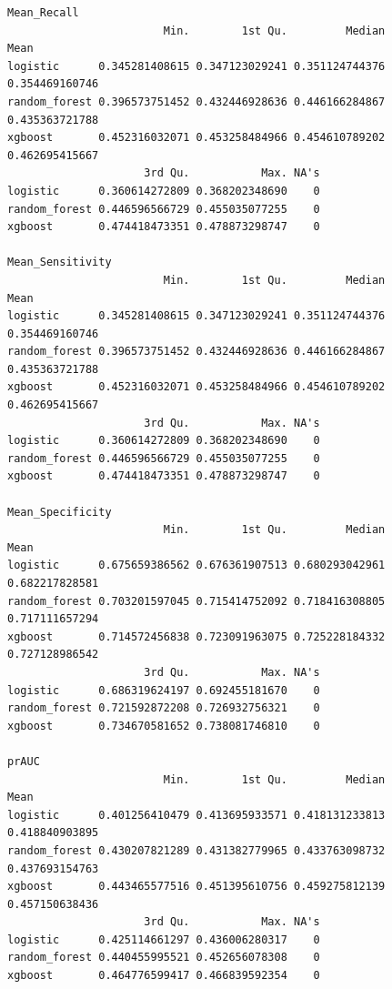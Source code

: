 \documentclass[
  letterpaper,
  DIV=11,
  numbers=noendperiod]{scrartcl}
\begin{document}
\begin{verbatim}
Mean_Recall 
                        Min.        1st Qu.         Median           Mean
logistic      0.345281408615 0.347123029241 0.351124744376 0.354469160746
random_forest 0.396573751452 0.432446928636 0.446166284867 0.435363721788
xgboost       0.452316032071 0.453258484966 0.454610789202 0.462695415667
                     3rd Qu.           Max. NA's
logistic      0.360614272809 0.368202348690    0
random_forest 0.446596566729 0.455035077255    0
xgboost       0.474418473351 0.478873298747    0

Mean_Sensitivity 
                        Min.        1st Qu.         Median           Mean
logistic      0.345281408615 0.347123029241 0.351124744376 0.354469160746
random_forest 0.396573751452 0.432446928636 0.446166284867 0.435363721788
xgboost       0.452316032071 0.453258484966 0.454610789202 0.462695415667
                     3rd Qu.           Max. NA's
logistic      0.360614272809 0.368202348690    0
random_forest 0.446596566729 0.455035077255    0
xgboost       0.474418473351 0.478873298747    0

Mean_Specificity 
                        Min.        1st Qu.         Median           Mean
logistic      0.675659386562 0.676361907513 0.680293042961 0.682217828581
random_forest 0.703201597045 0.715414752092 0.718416308805 0.717111657294
xgboost       0.714572456838 0.723091963075 0.725228184332 0.727128986542
                     3rd Qu.           Max. NA's
logistic      0.686319624197 0.692455181670    0
random_forest 0.721592872208 0.726932756321    0
xgboost       0.734670581652 0.738081746810    0

prAUC 
                        Min.        1st Qu.         Median           Mean
logistic      0.401256410479 0.413695933571 0.418131233813 0.418840903895
random_forest 0.430207821289 0.431382779965 0.433763098732 0.437693154763
xgboost       0.443465577516 0.451395610756 0.459275812139 0.457150638436
                     3rd Qu.           Max. NA's
logistic      0.425114661297 0.436006280317    0
random_forest 0.440455995521 0.452656078308    0
xgboost       0.464776599417 0.466839592354    0
\end{verbatim}
\end{document}
